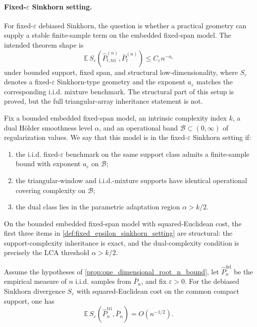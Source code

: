 \paragraph{Fixed-$\varepsilon$ Sinkhorn setting.}
For fixed-$\varepsilon$ debiased Sinkhorn, the question is whether a practical
geometry can supply a stable finite-sample term on the embedded fixed-span
model. The intended theorem shape is
\[
  \mathbb E\,S_{\varepsilon}\!\left(\widehat P_{t,\mathrm{tri}}^{(n)},\bar P_t^{(n)}\right)
  \le C_{\varepsilon} n^{-a_{\varepsilon}}
\]
under bounded support, fixed span, and structural low-dimensionality, where
$S_{\varepsilon}$ denotes a fixed-$\varepsilon$ Sinkhorn-type geometry and the
exponent $a_{\varepsilon}$ matches the corresponding i.i.d. mixture benchmark.
The structural part of this setup is proved, but the full triangular-array
inheritance statement is not.

\begin{definition}
\label{def:fixed_epsilon_sinkhorn_setting}
Fix a bounded embedded fixed-span model, an intrinsic complexity index $k$, a
dual H\"older smoothness level $\alpha$, and an operational band
$\mathcal B\subset(0,\infty)$ of regularization values. We say that this model
is in the fixed-$\varepsilon$ Sinkhorn setting if:
\begin{enumerate}[label=(\roman*)]
  \item the i.i.d. fixed-$\varepsilon$ benchmark on the same support class
  admits a finite-sample bound with exponent $a_{\varepsilon}$ on $\mathcal B$;
  \item the triangular-window and i.i.d.-mixture supports have identical
  operational covering complexity on $\mathcal B$;
  \item the dual class lies in the parametric adaptation region $\alpha>k/2$.
\end{enumerate}
\end{definition}

\begin{proposition}
\label{prop:operational_sinkhorn_ingredients}
On the bounded embedded fixed-span model with squared-Euclidean cost, the first
three items in \cref{def:fixed_epsilon_sinkhorn_setting} are structural: the
support-complexity inheritance is exact, and the dual-complexity condition is
precisely the LCA threshold $\alpha>k/2$.
\end{proposition}

\begin{proposition}
\label{prop:pointwise_sinkhorn_1d}
Assume the hypotheses of \cref{prop:one_dimensional_root_n_bound}, let
$\widehat P_n^{\mathrm{iid}}$ be the empirical measure of $n$ i.i.d. samples from
$\bar P_n$, and fix $\varepsilon>0$. For the debiased Sinkhorn divergence
$S_{\varepsilon}$ with squared-Euclidean cost on the common compact support,
one has
\[
  \mathbb E\,S_{\varepsilon}\!\left(\widehat P_n^{\mathrm{tri}},\bar P_n\right)
  = O(n^{-1/2}).
\]
\end{proposition}

